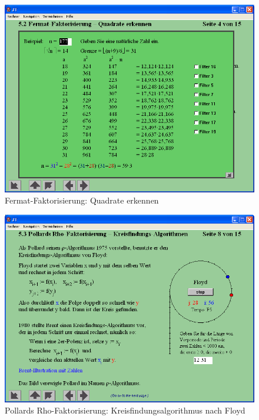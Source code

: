 \begin{refsegment}
\begin{figure}[ht]
\begin{center}
\includegraphics[scale=0.4]{figures/NT_Fig_C5-2_Fermat-factorization-How-far-2}
\caption{Fermat-Faktorisierung: Quadrate erkennen}
\label{NT_Fig_C5.2_Fermat-factorization-How-far-2}
\end{center}
\end{figure}


\begin{figure}[ht]
\begin{center}
\includegraphics[scale=0.4]{figures/NT_Fig_C5-3_PollardRho}
\caption{Pollards Rho-Faktorisierung: Kreisfindungsalgorithmus nach Floyd}
\label{NT_Fig_C5.3_PollardRho}
\end{center}
\end{figure}



\printbibliography[%
	heading=subbibliography,
	title={Literatur zu Kapitel \thesection},
	segment=\therefsegment,
]



\end{refsegment}

